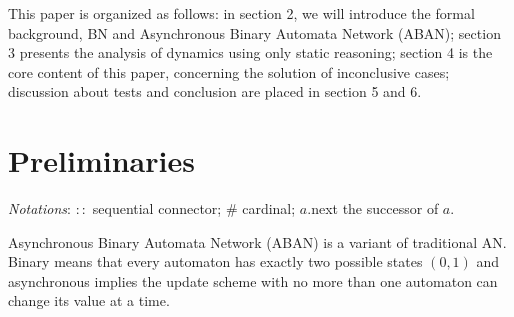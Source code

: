 \documentclass[runningheads]{llncs}
\begin{document}
This paper is organized as follows: in section 2, we will introduce the formal background, BN and Asynchronous Binary Automata Network (ABAN); section 3 presents the analysis of dynamics using only static reasoning; 
section 4 is the core content of this paper, concerning the solution of inconclusive cases; discussion about tests and conclusion are placed in section 5 and 6.

\section{Preliminaries}\label{sect:2}
\textit{Notations}:
$::$ sequential connector;
$\#$ cardinal;
$a.$next the successor of $a$. 

%

Asynchronous Binary Automata Network (ABAN) is a variant of traditional AN.
Binary means that every automaton has exactly two possible states $(0,1)$ and asynchronous implies the update scheme with no more than one automaton can change its value at a time. 
\end{document}
